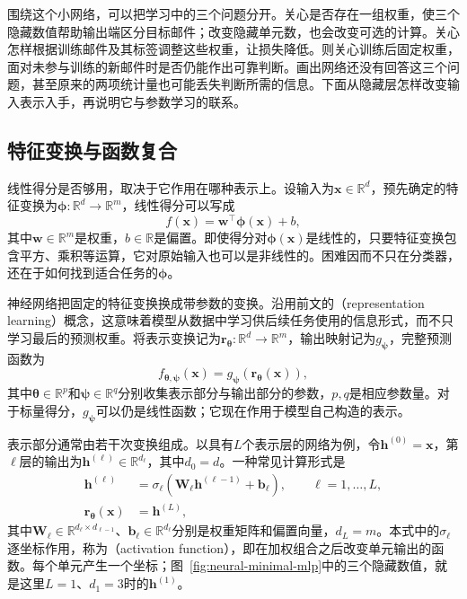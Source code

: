 围绕这个小网络，可以把学习中的三个问题分开。关心是否存在一组权重，使三个隐藏数值帮助输出端区分目标邮件；改变隐藏单元数，也会改变可选的计算。关心怎样根据训练邮件及其标签调整这些权重，让损失降低。则关心训练后固定权重，面对未参与训练的新邮件时是否仍能作出可靠判断。画出网络还没有回答这三个问题，甚至原来的两项统计量也可能丢失判断所需的信息。下面从隐藏层怎样改变输入表示入手，再说明它与参数学习的联系。

\subsection{特征变换与函数复合}
\label{sec:neural-feature-composition}

线性得分是否够用，取决于它作用在哪种表示上。设输入为$\bm{x}\in\mathbb{R}^{d}$，预先确定的特征变换为$\bm{\phi}:\mathbb{R}^{d}\to\mathbb{R}^{m}$，线性得分可以写成
\begin{equation}
  f(\bm{x})=\bm{w}^{\top}\bm{\phi}(\bm{x})+b,
  \label{eq:neural-fixed-features}
\end{equation}
其中$\bm{w}\in\mathbb{R}^{m}$是权重，$b\in\mathbb{R}$是偏置。即使得分对$\bm{\phi}(\bm{x})$是线性的，只要特征变换包含平方、乘积等运算，它对原始输入也可以是非线性的。困难因而不只在分类器，还在于如何找到适合任务的$\bm{\phi}$。

神经网络把固定的特征变换换成带参数的变换。沿用前文的（representation learning）概念，这意味着模型从数据中学习供后续任务使用的信息形式，而不只学习最后的预测权重。将表示变换记为$\bm{r}_{\bm{\theta}}:\mathbb{R}^{d}\to\mathbb{R}^{m}$，输出映射记为$g_{\bm{\psi}}$，完整预测函数为
\begin{equation}
  f_{\bm{\theta},\bm{\psi}}(\bm{x})
  =g_{\bm{\psi}}\!\left(\bm{r}_{\bm{\theta}}(\bm{x})\right),
  \label{eq:neural-representation-readout}
\end{equation}
其中$\bm{\theta}\in\mathbb{R}^{p}$和$\bm{\psi}\in\mathbb{R}^{q}$分别收集表示部分与输出部分的参数，$p,q$是相应参数量。对于标量得分，$g_{\bm{\psi}}$可以仍是线性函数；它现在作用于模型自己构造的表示。

表示部分通常由若干次变换组成。以具有$L$个表示层的网络为例，令$\bm{h}^{(0)}=\bm{x}$，第$\ell$层的输出为$\bm{h}^{(\ell)}\in\mathbb{R}^{d_\ell}$，其中$d_0=d$。一种常见计算形式是
\begin{equation}
  \begin{aligned}
    \bm{h}^{(\ell)}
      &=\sigma_\ell\!\left(\bm{W}_\ell\bm{h}^{(\ell-1)}+\bm{b}_\ell\right),
      \qquad \ell=1,\ldots,L,\\
    \bm{r}_{\bm{\theta}}(\bm{x})&=\bm{h}^{(L)},
  \end{aligned}
  \label{eq:neural-layer-composition}
\end{equation}
其中$\bm{W}_\ell\in\mathbb{R}^{d_\ell\times d_{\ell-1}}$、$\bm{b}_\ell\in\mathbb{R}^{d_\ell}$分别是权重矩阵和偏置向量，$d_L=m$。本式中的$\sigma_\ell$逐坐标作用，称为（activation function），即在加权组合之后改变单元输出的函数。每个单元产生一个坐标；图~\ref{fig:neural-minimal-mlp}中的三个隐藏数值，就是这里$L=1$、$d_1=3$时的$\bm{h}^{(1)}$。

